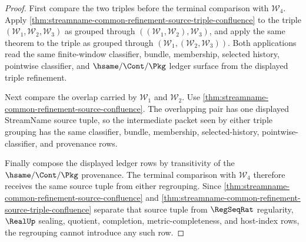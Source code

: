 \begin{proof}
First compare the two triples before the terminal comparison with
$\mathcal W_4$. Apply
\autoref{thm:streamname-common-refinement-source-triple-confluence} to the
triple $(\mathcal W_1,\mathcal W_2,\mathcal W_3)$ as grouped through
$((\mathcal W_1,\mathcal W_2),\mathcal W_3)$, and apply the same theorem to
the triple as grouped through
$(\mathcal W_1,(\mathcal W_2,\mathcal W_3))$. Both applications read the same
finite-window classifier, bundle, membership, selected history, pointwise
classifier, and $\hsame/\Cont/\Pkg$ ledger surface from the displayed triple
refinement.

Next compare the overlap carried by $\mathcal W_1$ and $\mathcal W_2$. Use
\autoref{thm:streamname-common-refinement-source-confluence}. The overlapping
pair has one displayed StreamName source tuple, so the intermediate packet
seen by either triple grouping has the same classifier, bundle, membership,
selected-history, pointwise-classifier, and provenance rows.

Finally compose the displayed ledger rows by transitivity of the
$\hsame/\Cont/\Pkg$ provenance. The terminal comparison with $\mathcal W_4$
therefore receives the same source tuple from either regrouping. Since
\autoref{thm:streamname-common-refinement-source-confluence} and
\autoref{thm:streamname-common-refinement-source-triple-confluence} separate
that source tuple from $\RegSeqRat$ regularity, $\RealUp$ sealing, quotient,
completion, metric-completeness, and host-index rows, the regrouping cannot
introduce any such row.
\end{proof}


